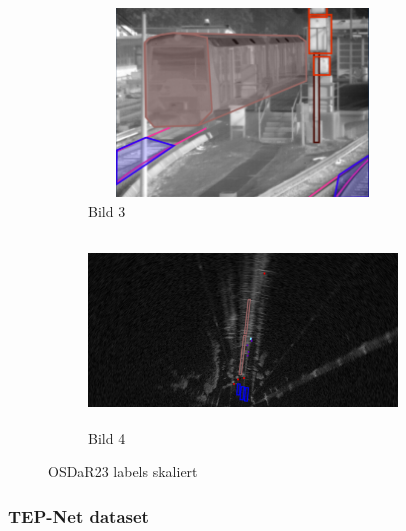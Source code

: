 \begin{figure}[H]
    \begin{subfigure}{0.45\textwidth}
        \centering
        \includegraphics[width=0.9\textwidth,height=5cm]{PICs/OSDaR23_dataset/labeled_IR.png}
        \caption{Bild 3}
    \end{subfigure}%
    \hspace{0.05\textwidth}
    \begin{subfigure}{0.45\textwidth}
        \centering
        \includegraphics[width=0.9\textwidth,height=5cm]{PICs/OSDaR23_dataset/labeled_Radar.png}
        \caption{Bild 4}
    \end{subfigure}
    
    \caption{OSDaR23 labels skaliert}
\end{figure}

\subsubsection{TEP-Net dataset}
\label{subsubsec:TEP-Net_dataset}


